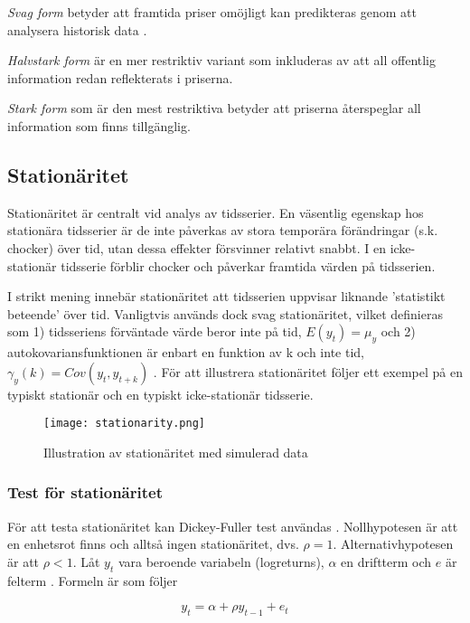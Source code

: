 \documentclass[12pt]{article}
\begin{document}
\emph{Svag form} betyder att framtida priser omöjligt kan predikteras genom att analysera historisk data .

\emph{Halvstark form} är en mer restriktiv variant som inkluderas av att all offentlig information redan reflekterats i priserna. 

\emph{Stark form} som är den mest restriktiva betyder att priserna återspeglar all information som finns tillgänglig.



\subsection{Stationäritet}
Stationäritet är centralt vid analys av tidsserier. En väsentlig egenskap hos stationära tidsserier är de inte påverkas av stora temporära förändringar (s.k. chocker) över tid, utan dessa effekter försvinner relativt snabbt. I en icke-stationär tidsserie förblir chocker och påverkar framtida värden på tidsserien. \par
I strikt mening innebär stationäritet att tidsserien uppvisar liknande 'statistikt beteende' över tid. Vanligtvis används dock svag stationäritet, vilket definieras som 1) tidsseriens förväntade värde beror inte på tid, \(E(y_t)=\mu_y\) och 2) autokovariansfunktionen är enbart en funktion av k och inte tid, \(\gamma_y(k) = Cov(y_t, y_{t+k})\) \parencite{montgomery2015forecasting}. För att illustrera stationäritet följer ett exempel på en typiskt stationär och en typiskt icke-stationär tidsserie.

\begin{figure}[H]
\caption{Illustration av stationäritet med simulerad data}
\texttt{[image: stationarity.png]}
\centering
\end{figure}

\subsubsection{Test för stationäritet}
För att testa stationäritet kan Dickey-Fuller test användas \parencite{dickey1979distribution}. Nollhypotesen är att en enhetsrot finns och alltså ingen stationäritet, dvs. \(\rho = 1\). Alternativhypotesen är att \(\rho < 1\). Låt \(y_t\) vara beroende variabeln (logreturns), \( \alpha \) en driftterm och \(e\) är felterm \parencite{wooldridge2018introductory}. Formeln är som följer

\begin{equation}
    y_t = \alpha + \rho y_{t-1} + e_t
\end{equation}
\end{document}
